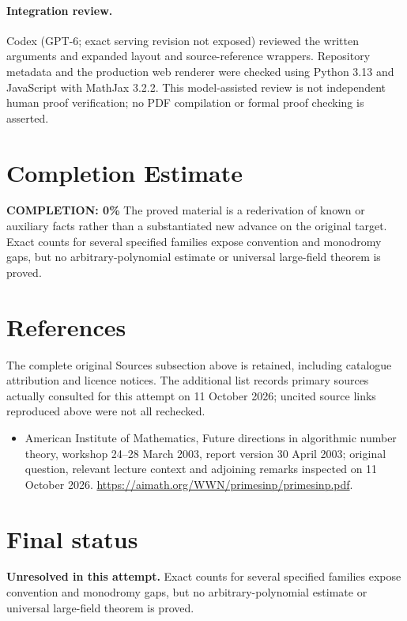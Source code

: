 \documentclass[11pt]{article}
\begin{document}
\paragraph{Integration review.} Codex (GPT-6; exact serving revision not exposed) reviewed the written arguments and expanded layout and source-reference wrappers. Repository metadata and the production web renderer were checked using Python 3.13 and JavaScript with MathJax 3.2.2. This model-assisted review is not independent human proof verification; no PDF compilation or formal proof checking is asserted.

\section{Completion Estimate}
\noindent\textbf{COMPLETION: 0\%}
The proved material is a rederivation of known or auxiliary facts rather than a substantiated new advance on the original target. Exact counts for several specified families expose convention and monodromy gaps, but no arbitrary-polynomial estimate or universal large-field theorem is proved.
\section{References}
The complete original Sources subsection above is retained, including catalogue attribution and licence notices. The additional list records primary sources actually consulted for this attempt on 11 October 2026; uncited source links reproduced above were not all rechecked.
\begin{itemize}
\item American Institute of Mathematics, Future directions in algorithmic number theory, workshop 24--28 March 2003, report version 30 April 2003; original question, relevant lecture context and adjoining remarks inspected on 11 October 2026. \url{https://aimath.org/WWN/primesinp/primesinp.pdf}.
\end{itemize}
\section{Final status}
\textbf{Unresolved in this attempt.} Exact counts for several specified families expose convention and monodromy gaps, but no arbitrary-polynomial estimate or universal large-field theorem is proved.
\end{document}
